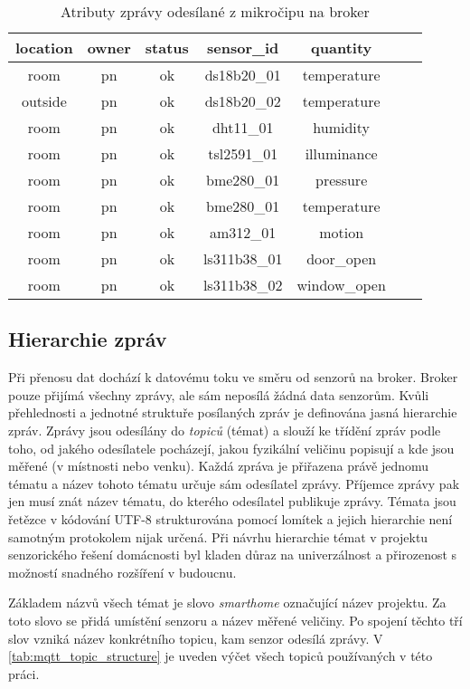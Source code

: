 \begin{table}[h]
\centering
 \begin{tabular}{|c|c|c|c|c|c|c|} 
 \hline
  location & owner & status\footnotemark & sensor\_id & quantity  \\
 \hline\hline
 room & pn & ok & ds18b20\_01 & temperature \\ 
 outside & pn & ok & ds18b20\_02 & temperature \\
 room & pn & ok & dht11\_01 & humidity \\
 room & pn & ok & tsl2591\_01 & illuminance \\
 room & pn & ok & bme280\_01 & pressure \\
 room & pn & ok & bme280\_01 & temperature \\
 room & pn & ok & am312\_01 & motion \\
 room & pn & ok & ls311b38\_01 & door\_open \\
 room & pn & ok & ls311b38\_02 & window\_open \\
 \hline
 \end{tabular}
 \caption{Atributy zprávy odesílané z mikročipu na broker}
 \label{tab:mqtt_msg_structure}
\end{table}


\subsection{Hierarchie zpráv} \label{subsec:message_hierarchy}
Při přenosu dat dochází k datovému toku ve směru od senzorů na broker. Broker pouze přijímá všechny zprávy, ale sám neposílá žádná data senzorům. Kvůli přehlednosti a jednotné struktuře posílaných zpráv je definována jasná hierarchie zpráv. Zprávy jsou odesílány do \textit{topiců} (témat) a slouží ke třídění zpráv podle toho, od jakého odesílatele pocházejí, jakou fyzikální veličinu popisují a kde jsou měřené (v místnosti nebo venku). Každá zpráva je přiřazena právě jednomu tématu a název tohoto tématu určuje sám odesílatel zprávy. Příjemce zprávy pak jen musí znát název tématu, do kterého odesílatel publikuje zprávy. Témata jsou řetězce v kódování UTF-8 strukturována pomocí lomítek a jejich hierarchie není samotným protokolem nijak určená. Při návrhu hierarchie témat v projektu senzorického řešení domácnosti byl kladen důraz na univerzálnost a přirozenost s možností snadného rozšíření v budoucnu. \par
Základem názvů všech témat je slovo \textit{smarthome} označující název projektu. Za toto slovo se přidá umístění senzoru a název měřené veličiny. Po spojení těchto tří slov vzniká název konkrétního topicu, kam senzor odesílá zprávy. V \cref{tab:mqtt_topic_structure} je uveden výčet všech topiců používaných v této práci.

